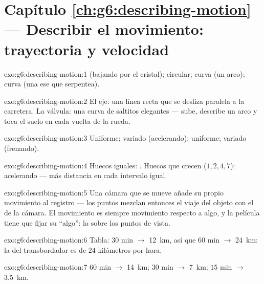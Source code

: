 \section*{Capítulo \ref{ch:g6:describing-motion} --- Describir el movimiento: trayectoria y velocidad}

\begin{solution}{exo:g6:describing-motion:1}
 (bajando por el cristal); circular; curva (un arco); curva
(una ese que serpentea).
\end{solution}

\begin{solution}{exo:g6:describing-motion:2}
El eje: una línea recta que se desliza paralela a la carretera. La
válvula: una curva de saltitos elegantes --- sube, describe un arco y
toca el suelo en cada vuelta de la rueda.
\end{solution}

\begin{solution}{exo:g6:describing-motion:3}
Uniforme; variado (acelerando); uniforme; variado (frenando).
\end{solution}

\begin{solution}{exo:g6:describing-motion:4}
Huecos iguales: . Huecos que crecen ($1, 2, 4,
7$): acelerando --- más distancia en cada intervalo igual.
\end{solution}

\begin{solution}{exo:g6:describing-motion:5}
Una cámara que se mueve añade su propio movimiento al registro --- los
puntos mezclan entonces el viaje del objeto con el de la cámara. El
movimiento es siempre movimiento respecto a algo, y la película tiene
que fijar su ``algo'': la  sobre los puntos de vista.
\end{solution}

\begin{solution}{exo:g6:describing-motion:6}
Tabla: $30$ min $\to$ \qty{12}{km}, así que $60$ min $\to$
\qty{24}{km}: la  del transbordador es de $24$ kilómetros
por hora.
\end{solution}

\begin{solution}{exo:g6:describing-motion:7}
$60$ min $\to$ \qty{14}{km}; $30$ min $\to$ \qty{7}{km}; $15$ min
$\to$ \qty{3.5}{km}.
\end{solution}

